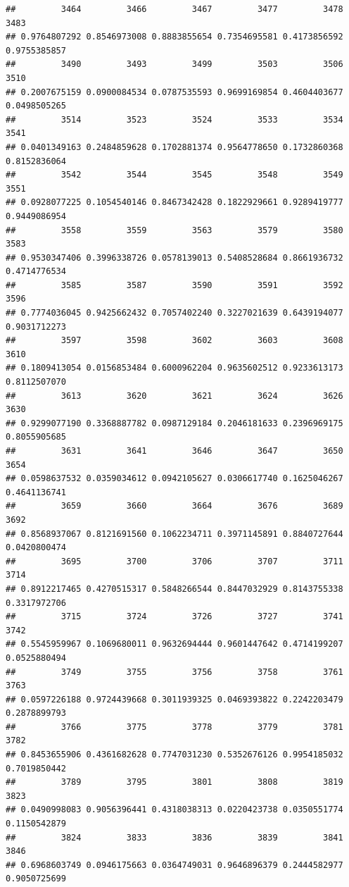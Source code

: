 \documentclass[
]{article}
\begin{document}
\begin{verbatim}
##         3464         3466         3467         3477         3478         3483 
## 0.9764807292 0.8546973008 0.8883855654 0.7354695581 0.4173856592 0.9755385857 
##         3490         3493         3499         3503         3506         3510 
## 0.2007675159 0.0900084534 0.0787535593 0.9699169854 0.4604403677 0.0498505265 
##         3514         3523         3524         3533         3534         3541 
## 0.0401349163 0.2484859628 0.1702881374 0.9564778650 0.1732860368 0.8152836064 
##         3542         3544         3545         3548         3549         3551 
## 0.0928077225 0.1054540146 0.8467342428 0.1822929661 0.9289419777 0.9449086954 
##         3558         3559         3563         3579         3580         3583 
## 0.9530347406 0.3996338726 0.0578139013 0.5408528684 0.8661936732 0.4714776534 
##         3585         3587         3590         3591         3592         3596 
## 0.7774036045 0.9425662432 0.7057402240 0.3227021639 0.6439194077 0.9031712273 
##         3597         3598         3602         3603         3608         3610 
## 0.1809413054 0.0156853484 0.6000962204 0.9635602512 0.9233613173 0.8112507070 
##         3613         3620         3621         3624         3626         3630 
## 0.9299077190 0.3368887782 0.0987129184 0.2046181633 0.2396969175 0.8055905685 
##         3631         3641         3646         3647         3650         3654 
## 0.0598637532 0.0359034612 0.0942105627 0.0306617740 0.1625046267 0.4641136741 
##         3659         3660         3664         3676         3689         3692 
## 0.8568937067 0.8121691560 0.1062234711 0.3971145891 0.8840727644 0.0420800474 
##         3695         3700         3706         3707         3711         3714 
## 0.8912217465 0.4270515317 0.5848266544 0.8447032929 0.8143755338 0.3317972706 
##         3715         3724         3726         3727         3741         3742 
## 0.5545959967 0.1069680011 0.9632694444 0.9601447642 0.4714199207 0.0525880494 
##         3749         3755         3756         3758         3761         3763 
## 0.0597226188 0.9724439668 0.3011939325 0.0469393822 0.2242203479 0.2878899793 
##         3766         3775         3778         3779         3781         3782 
## 0.8453655906 0.4361682628 0.7747031230 0.5352676126 0.9954185032 0.7019850442 
##         3789         3795         3801         3808         3819         3823 
## 0.0490998083 0.9056396441 0.4318038313 0.0220423738 0.0350551774 0.1150542879 
##         3824         3833         3836         3839         3841         3846 
## 0.6968603749 0.0946175663 0.0364749031 0.9646896379 0.2444582977 0.9050725699 

\end{verbatim}
\end{document}
